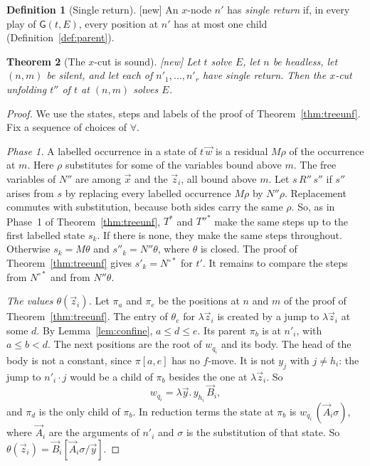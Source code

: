 \documentclass[11pt]{article}
\newcommand{\Gm}{\mathsf{G}}
\newcommand{\suc}[2]{#1{\cdot}#2}
\newcommand{\iv}[2]{\pi[#1,#2]}
\newcommand{\New}{\textsf{[new]}}
\theoremstyle{plain}
\newtheorem{theorem}{Theorem}[section]
\theoremstyle{definition}
\newtheorem{definition}[theorem]{Definition}
\theoremstyle{remark}
\begin{document}
\begin{definition}[Single return]\label{def:singleret}
\New{} An $x$-node $n'$ has \emph{single return} if, in every play of
$\Gm(t,E)$, every position at $n'$ has at most one child
(Definition~\ref{def:parent}).
\end{definition}

\begin{theorem}[The $x$-cut is sound]\label{thm:xcut}
\New{} Let $t$ solve $E$, let $n$ be headless, let $(n,m)$ be silent,
and let each of $n'_1,\dots,n'_r$ have single return.  Then the $x$-cut
unfolding $t''$ of $t$ at $(n,m)$ solves $E$.
\end{theorem}
\begin{proof}
We use the states, steps and labels of the proof of
Theorem~\ref{thm:treeunf}.  Fix a sequence of choices of $\forall$.

\emph{Phase 1.}  A labelled occurrence in a state of $t\,\vec w$ is a
residual $M\rho$ of the occurrence at $m$.  Here $\rho$ substitutes for
some of the variables bound above $m$.  The free variables of $N''$ are
among $\vec x$ and the $\vec z_i$, all bound above $m$.  Let $s\,R''\,s''$
if $s''$ arises from $s$ by replacing every labelled occurrence $M\rho$
by $N''\rho$.  Replacement commutes with substitution, because both sides
carry the same $\rho$.  So, as in Phase~1 of
Theorem~\ref{thm:treeunf}, $T^*$ and $T''^*$ make the same steps up to
the first labelled state $s_k$.  If there is none, they make the same
steps throughout.  Otherwise $s_k=M\theta$ and $s''_k=N''\theta$, where
$\theta$ is closed.  The proof of Theorem~\ref{thm:treeunf} gives
$s'_k=N^{\circ*}$ for $t'$.  It remains to compare the steps from
$N^{\circ*}$ and from $N''\theta$.

\emph{The values $\theta(\vec z_i)$.}  Let $\pi_a$ and $\pi_e$ be the
positions at $n$ and $m$ of the proof of Theorem~\ref{thm:treeunf}.  The
entry of $\theta_e$ for $\lambda\vec z_i$ is created by a jump to
$\lambda\vec z_i$ at some $d$.  By Lemma~\ref{lem:confine}, $a\le d\le e$.
Its parent $\pi_b$ is at $n'_i$, with $a\le b<d$.  The next positions are
the root of $w_{q_i}$ and its body.  The head of the body is not a
constant, since $\iv ae$ has no $f$-move.  It is not $y_j$ with $j\ne
h_i$: the jump to $\suc{n'_i}{j}$ would be a child of $\pi_b$ besides
the one at $\lambda\vec z_i$.  So
\[
w_{q_i}=\lambda\vec y.\,y_{h_i}\,\vec B_i,
\]
and $\pi_d$ is the only child of $\pi_b$.  In reduction terms the state
at $\pi_b$ is $w_{q_i}\,(\vec A_i\sigma)$, where $\vec A_i$ are the
arguments of $n'_i$ and $\sigma$ is the substitution of that state.  So
$\theta(\vec z_i)=\vec B_i[\vec A_i\sigma/\vec y]$.


\end{proof}
\end{document}
